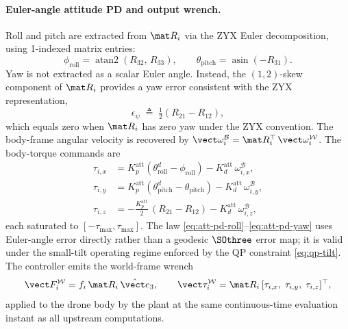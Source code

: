 \paragraph{Euler-angle attitude PD and output wrench.} Roll and pitch are extracted from $\mat R_i$ via the ZYX Euler decomposition, using 1-indexed matrix entries:
\begin{equation}
  \phi_{\mathrm{roll}} = \operatorname{atan2}(R_{32},\, R_{33}),
  \qquad
  \theta_{\mathrm{pitch}} = \operatorname{asin}(-R_{31}).
  \label{eq:euler-extract}
\end{equation}
Yaw is not extracted as a scalar Euler angle. Instead, the $(1,2)$-skew component of $\mat R_i$ provides a yaw error consistent with the ZYX representation,
\begin{equation}
  \epsilon_\psi \;\triangleq\; \tfrac{1}{2}(R_{21} - R_{12}),
  \label{eq:yaw-skew}
\end{equation}
which equals zero when $\mat R_i$ has zero yaw under the ZYX convention. The body-frame angular velocity is recovered by $\vect\omega_i^{\mathcal{B}} = \mat R_i^{\top}\, \vect\omega_i^{\mathcal{W}}$. The body-torque commands are
\begin{align}
  \tau_{i,x}
    &= K_p^{\mathrm{att}}\!\left(
         \theta_{\mathrm{roll}}^d - \phi_{\mathrm{roll}}
       \right)
      - K_d^{\mathrm{att}}\,\omega_{i,x}^{\mathcal{B}},
    \label{eq:att-pd-roll} \\[2pt]
  \tau_{i,y}
    &= K_p^{\mathrm{att}}\!\left(
         \theta_{\mathrm{pitch}}^d - \theta_{\mathrm{pitch}}
       \right)
      - K_d^{\mathrm{att}}\,\omega_{i,y}^{\mathcal{B}},
    \label{eq:att-pd-pitch} \\[2pt]
  \tau_{i,z}
    &= -\frac{K_p^{\mathrm{att}}}{2}\,(R_{21} - R_{12})
          - K_d^{\mathrm{att}}\,\omega_{i,z}^{\mathcal{B}},
    \label{eq:att-pd-yaw}
\end{align}
each saturated to $[-\tau_{\max}, \tau_{\max}]$. The law \eqref{eq:att-pd-roll}--\eqref{eq:att-pd-yaw} uses Euler-angle error directly rather than a geodesic $\SOthree$ error map; it is valid under the small-tilt operating regime enforced by the QP constraint \eqref{eq:qp-tilt}. The controller emits the world-frame wrench
\begin{equation}
  \vect F_i^{\mathcal{W}} = f_i\,\mat R_i\,\hat{\vect e}_3,
  \qquad
  \vect\tau_i^{\mathcal{W}} = \mat R_i\,
    [\tau_{i,x},\; \tau_{i,y},\; \tau_{i,z}]^{\top},
  \label{eq:wrench}
\end{equation}
applied to the drone body by the plant at the same continuous-time evaluation instant as all upstream computations.


